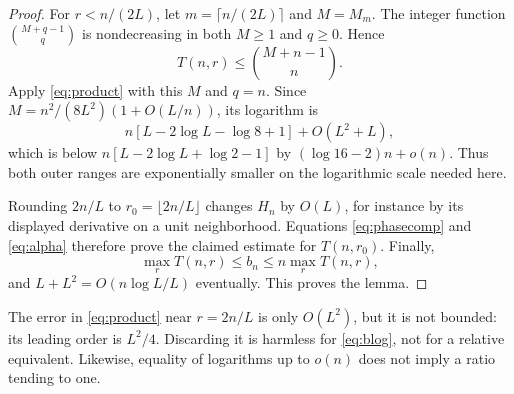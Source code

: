 \begin{proof}
For $r<n/(2L)$, let $m=\lceil n/(2L)\rceil$ and $M=M_m$. The integer function $\binom{M+q-1}{q}$ is nondecreasing in both $M\ge1$ and $q\ge0$. Hence
\[
 T(n,r)\le\binom{M+n-1}{n}.
\]
Apply \eqref{eq:product} with this $M$ and $q=n$. Since
$M=n^2/(8L^2)(1+O(L/n))$, its logarithm is
\[
 n[L-2\log L-\log8+1]+O(L^2+L),
\]
which is below $n[L-2\log L+\log2-1]$ by
$(\log16-2)n+o(n)$. Thus both outer ranges are exponentially smaller on the logarithmic scale needed here.

Rounding $2n/L$ to $r_0=\lfloor2n/L\rfloor$ changes $H_n$ by $O(L)$, for instance by its displayed derivative on a unit neighborhood. Equations \eqref{eq:phasecomp} and \eqref{eq:alpha} therefore prove the claimed estimate for $T(n,r_0)$. Finally,
\[
 \max_r T(n,r)\le b_n\le n\max_r T(n,r),
\]
and $L+L^2=O(n\log L/L)$ eventually. This proves the lemma.
\end{proof}
\begin{remark}
The error in \eqref{eq:product} near $r=2n/L$ is only $O(L^2)$, but it is not bounded: its leading order is $L^2/4$. Discarding it is harmless for \eqref{eq:blog}, not for a relative equivalent. Likewise, equality of logarithms up to $o(n)$ does not imply a ratio tending to one.
\end{remark}
